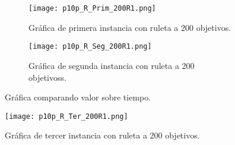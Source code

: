 \documentclass{article}
\begin{document}
\begin{figure}[H]
\centering
\begin{subfigure}[b]{0.40\linewidth}
\texttt{[image: p10p\_R\_Prim\_200R1.png]}
\caption{Gráfica de primera instancia con ruleta a 200 objetivos.}
\end{subfigure}
\begin{subfigure}[b]{0.40\linewidth}
\texttt{[image: p10p\_R\_Seg\_200R1.png]}
\caption{Gráfica de segunda instancia con ruleta a 200 objetivoss.}
\end{subfigure}
\caption{Gráfica comparando valor sobre tiempo.}
\label{fig:westminster}
\end{figure}

\begin{figure}[H]
\centering
\texttt{[image: p10p\_R\_Ter\_200R1.png]}
\caption{\label{fig3} Gráfica de tercer instancia con ruleta a 200 objetivos.}
\end{figure}

\printbibliography
\end{document}
